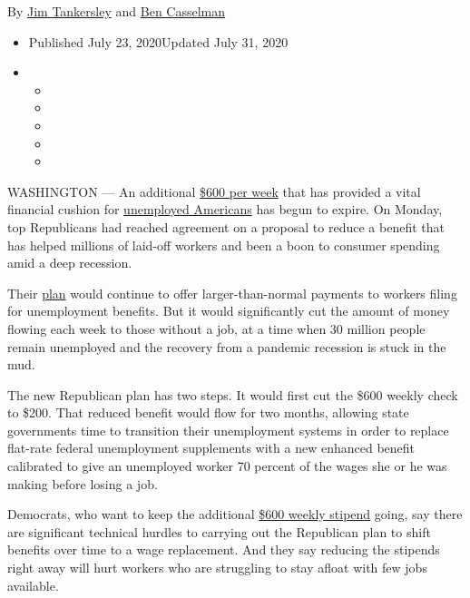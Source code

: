 By \href{https://www.nytimes3xbfgragh.onion/by/jim-tankersley}{Jim
Tankersley} and
\href{https://www.nytimes3xbfgragh.onion/by/ben-casselman}{Ben
Casselman}

\begin{itemize}
\item
  Published July 23, 2020Updated July 31, 2020
\item
  \begin{itemize}
  \item
  \item
  \item
  \item
  \item
  \end{itemize}
\end{itemize}

WASHINGTON --- An additional
\href{https://www.nytimes3xbfgragh.onion/2020/07/28/podcasts/the-daily/unemployment-benefits-coronavirus.html}{\$600
per week} that has provided a vital financial cushion for
\href{https://www.nytimes3xbfgragh.onion/2020/07/23/business/economy/unemployment-economy-coronavirus.html}{unemployed
Americans} has begun to expire. On Monday, top Republicans had reached
agreement on a proposal to reduce a benefit that has helped millions of
laid-off workers and been a boon to consumer spending amid a deep
recession.

Their
\href{https://www.nytimes3xbfgragh.onion/2020/07/23/world/coronavirus-covid-19.html\#link-af5a16a}{plan}
would continue to offer larger-than-normal payments to workers filing
for unemployment benefits. But it would significantly cut the amount of
money flowing each week to those without a job, at a time when 30
million people remain unemployed and the recovery from a pandemic
recession is stuck in the mud.

The new Republican plan has two steps. It would first cut the \$600
weekly check to \$200. That reduced benefit would flow for two months,
allowing state governments time to transition their unemployment systems
in order to replace flat-rate federal unemployment supplements with a
new enhanced benefit calibrated to give an unemployed worker 70 percent
of the wages she or he was making before losing a job.

Democrats, who want to keep the additional
\href{https://www.nytimes3xbfgragh.onion/2020/07/21/business/economy/coronavirus-unemployment-benefits.html}{\$600
weekly stipend} going, say there are significant technical hurdles to
carrying out the Republican plan to shift benefits over time to a wage
replacement. And they say reducing the stipends right away will hurt
workers who are struggling to stay afloat with few jobs available.

